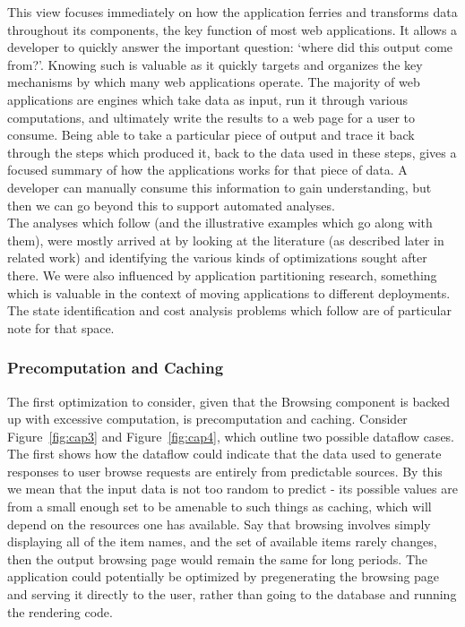 \documentclass[msc,oneside]{ubcthesis}
\begin{document}
This view focuses immediately on how the application ferries and transforms data throughout its components, the key function of most web applications. It allows a developer to quickly answer the important question: `where did this output come from?'. Knowing such is valuable as it quickly targets and organizes the key mechanisms by which many web applications operate. The majority of web applications are engines which take data as input, run it through various computations, and ultimately write the results to a web page for a user to consume. Being able to take a particular piece of output and trace it back through the steps which produced it, back to the data used in these steps, gives a focused summary of how the applications works for that piece of data. A developer can manually consume this information to gain understanding, but then we can go beyond this to support automated analyses. \\

The analyses which follow (and the illustrative examples which go along with them), were mostly arrived at by looking at the literature (as described later in related work) and identifying the various kinds of optimizations sought after there. We were also influenced by application partitioning research, something which is valuable in the context of moving applications to different deployments. The state identification and cost analysis problems which follow are of particular note for that space.

\subsubsection{Precomputation and Caching}
The first optimization to consider, given that the Browsing component is backed up with excessive computation, is precomputation and caching. Consider Figure~\ref{fig:cap3} and Figure~\ref{fig:cap4}, which outline two possible dataflow cases. The first shows how the dataflow could indicate that the data used to generate responses to user browse requests are entirely from predictable sources. By this we mean that the input data is not too random to predict - its possible values are from a small enough set to be amenable to such things as caching, which will depend on the resources one has available. Say that browsing involves simply displaying all of the item names, and the set of available items rarely changes, then the output browsing page would remain the same for long periods. The application could potentially be optimized by pregenerating the browsing page and serving it directly to the user, rather than going to the database and running the rendering code.\\
\end{document}
